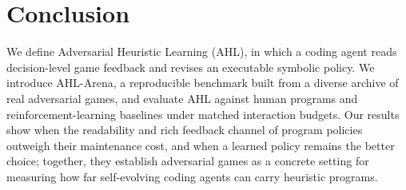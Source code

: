 %
%
%

\section{Conclusion}

We define Adversarial Heuristic Learning (AHL), in which a coding agent reads
decision-level game feedback and revises an executable symbolic policy. We introduce
AHL-Arena, a reproducible benchmark built from a diverse archive of real adversarial
games, and evaluate AHL against human programs and reinforcement-learning baselines
under matched interaction budgets. Our results show when the readability and rich
feedback channel of program policies outweigh their maintenance cost, and when a
learned policy remains the better choice; together, they establish adversarial games
as a concrete setting for measuring how far self-evolving coding agents can carry
heuristic programs.
